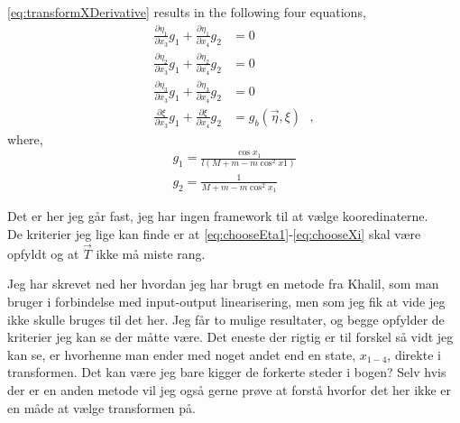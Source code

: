 \autoref{eq:transformXDerivative} results in the following four equations,
\begin{align}
    \frac{\partial \eta_1}{\partial x_3} g_1 + \frac{\partial \eta_1}{\partial x_4} g_2 &= 0                    \label{eq:chooseEta1}  \\
    \frac{\partial \eta_2}{\partial x_3} g_1 + \frac{\partial \eta_2}{\partial x_4} g_2 &= 0                    \label{eq:chooseEta2}  \\
    \frac{\partial \eta_3}{\partial x_3} g_1 + \frac{\partial \eta_3}{\partial x_4} g_2 &= 0                    \label{eq:chooseEta3}  \\
    \frac{\partial \xi   }{\partial x_3} g_1 + \frac{\partial \xi   }{\partial x_4} g_2 &= g_b(\vec{\eta},\xi)  \label{eq:chooseXi} 
\ \ \ ,
\end{align}
where,
\begin{align}
g_1 = \frac{\cos x_1}{l (M + m - m \cos^2 x1)}\\
g_2 = \frac{1}{M + m - m \cos^2 x_1 }
\end{align}

Det er her jeg går fast, jeg har ingen framework til at vælge kooredinaterne.\\
De kriterier jeg lige kan finde er at \autoref{eq:chooseEta1}-\ref{eq:chooseXi} skal være opfyldt og at $\vec{T}$ ikke må miste rang.

Jeg har skrevet ned her hvordan jeg har brugt en metode fra Khalil, som man bruger i forbindelse med input-output linearisering, men som jeg fik at vide jeg ikke skulle bruges til det her. Jeg får to mulige resultater, og begge opfylder de kriterier jeg kan se der måtte være. Det eneste der rigtig er til forskel så vidt jeg kan se, er hvorhenne man ender med noget andet end en state, $x_{1-4}$, direkte i transformen. Det kan være jeg bare kigger de forkerte steder i bogen? Selv hvis der er en anden metode vil jeg også gerne prøve at forstå hvorfor det her ikke er en måde at vælge transformen på.

